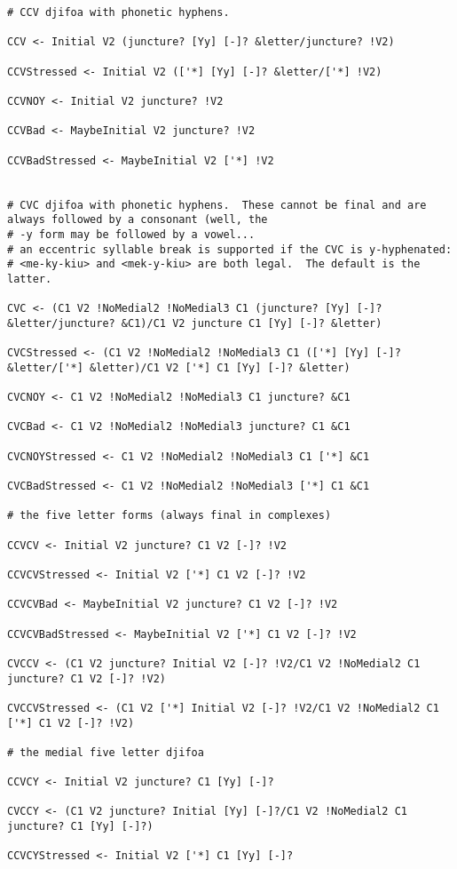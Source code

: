 \documentclass{article}
\begin{document}
\begin{verbatim}
# CCV djifoa with phonetic hyphens.

CCV <- Initial V2 (juncture? [Yy] [-]? &letter/juncture? !V2)

CCVStressed <- Initial V2 (['*] [Yy] [-]? &letter/['*] !V2)

CCVNOY <- Initial V2 juncture? !V2

CCVBad <- MaybeInitial V2 juncture? !V2

CCVBadStressed <- MaybeInitial V2 ['*] !V2


# CVC djifoa with phonetic hyphens.  These cannot be final and are always followed by a consonant (well, the
# -y form may be followed by a vowel...
# an eccentric syllable break is supported if the CVC is y-hyphenated:
# <me-ky-kiu> and <mek-y-kiu> are both legal.  The default is the latter.

CVC <- (C1 V2 !NoMedial2 !NoMedial3 C1 (juncture? [Yy] [-]? &letter/juncture? &C1)/C1 V2 juncture C1 [Yy] [-]? &letter)

CVCStressed <- (C1 V2 !NoMedial2 !NoMedial3 C1 (['*] [Yy] [-]? &letter/['*] &letter)/C1 V2 ['*] C1 [Yy] [-]? &letter)

CVCNOY <- C1 V2 !NoMedial2 !NoMedial3 C1 juncture? &C1

CVCBad <- C1 V2 !NoMedial2 !NoMedial3 juncture? C1 &C1

CVCNOYStressed <- C1 V2 !NoMedial2 !NoMedial3 C1 ['*] &C1

CVCBadStressed <- C1 V2 !NoMedial2 !NoMedial3 ['*] C1 &C1

# the five letter forms (always final in complexes)

CCVCV <- Initial V2 juncture? C1 V2 [-]? !V2

CCVCVStressed <- Initial V2 ['*] C1 V2 [-]? !V2

CCVCVBad <- MaybeInitial V2 juncture? C1 V2 [-]? !V2

CCVCVBadStressed <- MaybeInitial V2 ['*] C1 V2 [-]? !V2

CVCCV <- (C1 V2 juncture? Initial V2 [-]? !V2/C1 V2 !NoMedial2 C1 juncture? C1 V2 [-]? !V2)

CVCCVStressed <- (C1 V2 ['*] Initial V2 [-]? !V2/C1 V2 !NoMedial2 C1 ['*] C1 V2 [-]? !V2)

# the medial five letter djifoa

CCVCY <- Initial V2 juncture? C1 [Yy] [-]?

CVCCY <- (C1 V2 juncture? Initial [Yy] [-]?/C1 V2 !NoMedial2 C1 juncture? C1 [Yy] [-]?)

CCVCYStressed <- Initial V2 ['*] C1 [Yy] [-]?


\end{verbatim}
\end{document}
